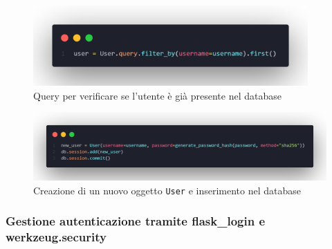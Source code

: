 \documentclass[12pt]{article}
\def\code#1{\texttt{#1}}
\begin{document}
\vskip 0.3cm
\begin{figure}[h]
    \centering
    \includegraphics[width=10.5cm]{query.png}
    \caption{Query per verificare se l'utente è già presente nel database}
\end{figure}
\vskip 0.3cm
\begin{figure}[h]
    \centering
    \includegraphics[width=16cm]{db-add.png}
    \caption{Creazione di un nuovo oggetto \code{User} e inserimento nel database}
\end{figure}

\subsubsection{Gestione autenticazione tramite flask\_login e werkzeug.security}
\end{document}

